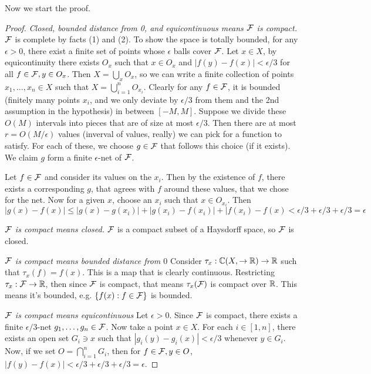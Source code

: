 Now we start the proof.
\begin{proof}
    \textit{Closed, bounded distance from 0, and equicontinuous means $\mathcal{F}$ is compact.}
    $\mathcal{F}$ is complete by facts (1) and (2). To show the space is totally bounded,
    for any $\epsilon > 0$, there exist a finite set of points whose $\epsilon$ balls
    cover $\mathcal{F}$. Let $x \in X$, by equicontinuity there exists $O_x$
    such that $x \in O_x$ and $|f(y) - f(x) | < \epsilon/3$ for all $f \in \mathcal{F}, y \in O_x$.
    Then $X = \bigcup_x O_x$, so we can write a finite collection of points $x_1, \dots, x_n \in X$
    such that $X = \bigcup_{i = 1}^{n} O_{x_i}$. Clearly for any $f \in \mathcal{F}$, it is bounded (finitely many points $x_i$,
    and we only deviate by $\epsilon/3$ from them and the 2nd assumption in the hypothesis) in between $[-M, M]$. Suppose we divide these $O(M)$ intervals into pieces
    that are of size at most $\epsilon/3$. Then there are at most $r = O(M/\epsilon)$ values (inverval of values, really) we can pick
    for a function to satisfy. For each of these, we choose $g \in \mathcal{F}$ that follows this choice (if it exists).
    We claim $g$ form a finite $\epsilon$-net of $\mathcal{F}$.

    Let $f \in \mathcal{F}$ and consider its values on the $x_i$. Then by the existence of $f$, there exists
    a corresponding $g$, that agrees with $f$ around these values, that we chose for the net.
    Now for a given $x$, choose an $x_i$ such that $x \in O_{x_i}$.
    Then 
    \[ |g(x) - f(x)| \le |g(x) - g(x_i)| + |g(x_i) - f(x_i)| + |f(x_i) - f(x) < \epsilon/3 + \epsilon/3 + \epsilon/3 = \epsilon \]

    \textit{$\mathcal{F}$ is compact means closed.} $\mathcal{F}$ is a compact subset of a Haysdorff space, so $\mathcal{F}$ is closed.

    \textit{$\mathcal{F}$ is compact means bounded distance from $0$}
    Consider $\tau_x: \operatorname{\mathbb{C}}(X, \to \operatorname{\mathbb{R}}) \to \operatorname{\mathbb{R}}$ such that $\tau_x(f) = f(x)$. This is a map that is clearly continuous.
    Restricting $\tau_x: \mathcal{F} \to \operatorname{\mathbb{R}}$, then since $\mathcal{F}$ is compact, that means $\tau_x(\mathcal{F})$ is compact over $\operatorname{\mathbb{R}}$.
    This means it's bounded, e.g. $\{f(x) : f \in \mathcal{F} \}$ is bounded.

    \textit{$\mathcal{F}$ is compact means equicontinuous} Let $\epsilon > 0$. Since $\mathcal{F}$ is compact, there exists
    a finite $\epsilon/3$-net $g_1, \dots, g_n \in \mathcal{F}$. Now take a point $x \in X$. For each $i \in [1, n]$,
    there exists an open set $G_i \ni x$ such that $|g_i(y) - g_i(x) | < \epsilon/3$ whenever $y \in G_i$.
    Now, if we set $O = \bigcap_{i = 1}^n G_i$,
    then for $f \in \mathcal{F}, y \in O$, $|f(y) - f(x)| < \epsilon/3 + \epsilon/3 + \epsilon/3 = \epsilon$.
\end{proof}

